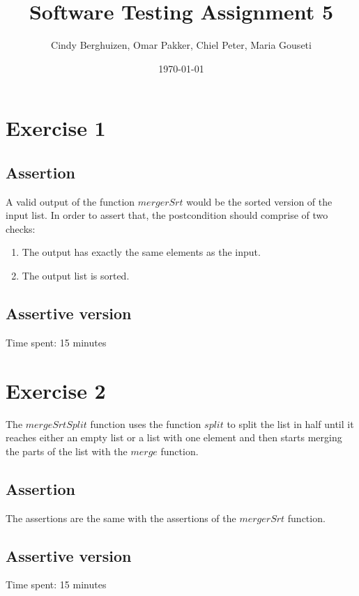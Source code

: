 \documentclass{article}
\begin{document}
\setlength{\parindent}{0cm}
\title{Software Testing Assignment 5}
\author{Cindy Berghuizen, Omar Pakker, Chiel Peter,  Maria Gouseti}
\date{\today}
\maketitle

\section*{Exercise 1}
\subsection*{Assertion}
A valid output of the function $mergerSrt$ would be the sorted version of the input list. In order to assert that, the postcondition should comprise of two checks:
\begin{enumerate}
 \item The output has exactly the same elements as the input.
 \item The output list is sorted.
\end{enumerate}

\subsection*{Assertive version}

Time spent: 15 minutes

\section*{Exercise 2}
The $mergeSrtSplit$ function uses the function $split$ to split the list in half until it reaches either an empty list or a list with one element and then starts merging the parts of the list  with the $merge$ function.

\subsection*{Assertion}
The assertions are the same with the assertions of the $mergerSrt$ function.
\subsection*{Assertive version}

Time spent: 15 minutes
\end{document}
